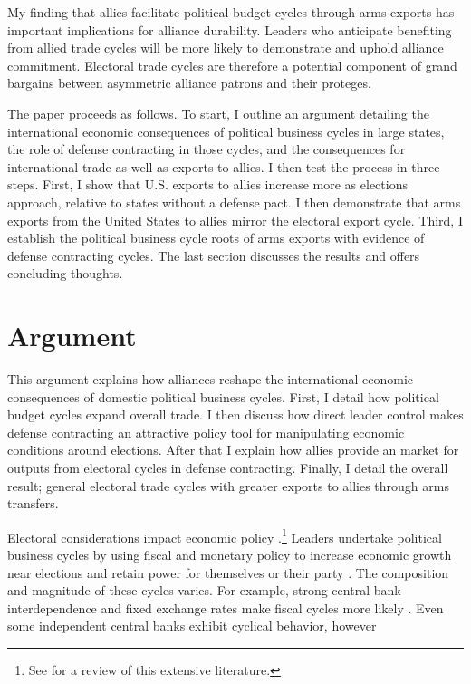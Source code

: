 \documentclass[12pt]{article}
\begin{document}
My finding that allies facilitate political budget cycles through arms exports has important implications for alliance durability. 
Leaders who anticipate benefiting from allied trade cycles will be more likely to demonstrate and uphold alliance commitment. 
Electoral trade cycles are therefore a potential component of grand bargains between asymmetric alliance patrons and their proteges. 


The paper proceeds as follows. 
To start, I outline an argument detailing the international economic consequences of political business cycles in large states, the role of defense contracting in those cycles, and the consequences for international trade as well as exports to allies.
I then test the process in three steps. 
First, I show that U.S. exports to allies increase more as elections approach, relative to states without a defense pact. 
I then demonstrate that arms exports from the United States to allies mirror the electoral export cycle.
Third, I establish the political business cycle roots of arms exports with evidence of defense contracting cycles.
The last section discusses the results and offers concluding thoughts.


\section{Argument}


This argument explains how alliances reshape the international economic consequences of domestic political business cycles. 
First, I detail how political budget cycles expand overall trade.
I then discuss how direct leader control makes defense contracting an attractive policy tool for manipulating economic conditions around elections. 
After that I explain how allies provide an market for outputs from electoral cycles in defense contracting. 
Finally, I detail the overall result; general electoral trade cycles with greater exports to allies through arms transfers. 


Electoral considerations impact economic policy \citep{Nordhaus1975}.\footnote{See \citet{Dubois2016} for a review of this extensive literature.} 
Leaders undertake political business cycles by using fiscal and monetary policy to increase economic growth near elections and retain power for themselves or their party \citep{Tufte1978, Rogoff1987}. 
The composition and magnitude of these cycles varies. 
For example, strong central bank interdependence and fixed exchange rates make fiscal cycles more likely \citep{ClarkHallerberg2000}. 
Even some independent central banks exhibit cyclical behavior, however \citep[pg. 247]{Dubois2016}
\end{document}
